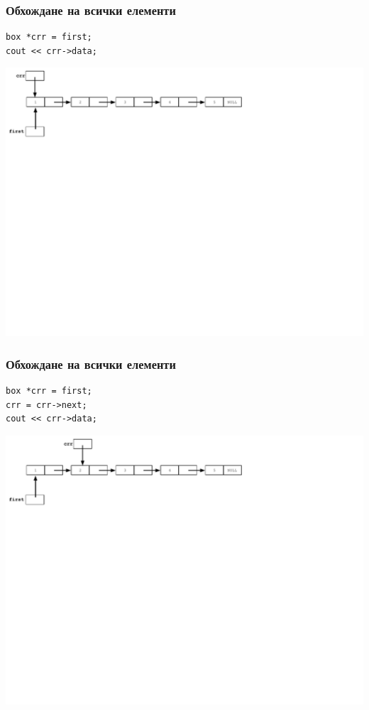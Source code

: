 \documentclass{beamer}
\begin{document}
\begin{frame}[fragile]
\frametitle{Обхождане на всички елементи}

\begin{flushleft}
\begin{lstlisting}
box *crr = first;
cout << crr->data;
\end{lstlisting}  
\end{flushleft}


\includegraphics[width=14.0cm]{images/04_ll_trav_start}

\end{frame}


\begin{frame}[fragile]
\frametitle{Обхождане на всички елементи}

\begin{flushleft}
\begin{lstlisting}
box *crr = first;
crr = crr->next;
cout << crr->data;
\end{lstlisting}  
\end{flushleft}


\includegraphics[width=14.0cm]{images/04_ll_trav_stepone}

\end{frame}
\end{document}
